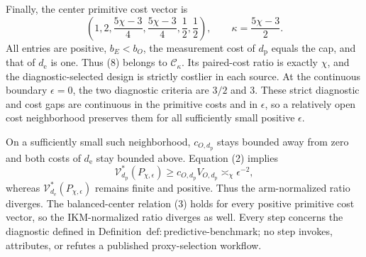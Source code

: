 Finally, the center primitive cost vector is
\[
 \left(1,2,\frac{5\chi-3}{4},\frac{5\chi-3}{4},\frac12,\frac12\right),
 \qquad \kappa=\frac{5\chi-3}{2}. \tag{8}
\]
All entries are positive, \(b_E<b_O\), the measurement cost of \(d_{\mathrm p}\) equals the cap, and that of \(d_{\mathrm e}\) is one.  Thus (8) belongs to \(\mathcal C_\kappa\).  Its paired-cost ratio is exactly \(\chi\), and the diagnostic-selected design is strictly costlier in each source.  At the continuous boundary \(\epsilon=0\), the two diagnostic criteria are \(3/2\) and \(3\).  These strict diagnostic and cost gaps are continuous in the primitive costs and in \(\epsilon\), so a relatively open cost neighborhood preserves them for all sufficiently small positive \(\epsilon\).

On a sufficiently small such neighborhood, \(c_{O,d_{\mathrm p}}\) stays bounded away from zero and both costs of \(d_{\mathrm e}\) stay bounded above.  Equation (2) implies
\[
 \mathcal V_{d_{\mathrm p}}^*(P_{\chi,\epsilon})
 \ge c_{O,d_{\mathrm p}}V_{O,d_{\mathrm p}}
 \asymp_\chi\epsilon^{-2},
\]
whereas \(\mathcal V_{d_{\mathrm e}}^*(P_{\chi,\epsilon})\) remains finite and positive.  Thus the arm-normalized ratio diverges.  The balanced-center relation (3) holds for every positive primitive cost vector, so the IKM-normalized ratio diverges as well.  Every step concerns the diagnostic defined in Definition~\(\mathrm{def{:}predictive\text{-}benchmark}\); no step invokes, attributes, or refutes a published proxy-selection workflow.